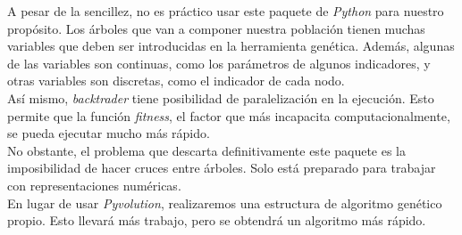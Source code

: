     A pesar de la sencillez, no es pr\'actico usar este paquete de \textit{Python} para nuestro prop\'osito. Los \'arboles que van a componer nuestra poblaci\'on tienen muchas variables que deben ser introducidas en la herramienta gen\'etica. Adem\'as, algunas de las variables son continuas, como los par\'ametros de algunos indicadores, y otras variables son discretas, como el indicador de cada nodo.\\
    
    As\'i mismo, \textit{backtrader} tiene posibilidad de paralelizaci\'on en la ejecuci\'on. Esto permite que la funci\'on \textit{fitness}, el factor que m\'as incapacita computacionalmente, se pueda ejecutar mucho m\'as r\'apido.\\
    
    No obstante, el problema que descarta definitivamente este paquete es la imposibilidad de hacer cruces entre \'arboles. Solo est\'a preparado para trabajar con representaciones num\'ericas.\\
    
    En lugar de usar \textit{Pyvolution}, realizaremos una estructura de algoritmo gen\'etico propio. Esto llevar\'a m\'as trabajo, pero se obtendr\'a un algoritmo m\'as r\'apido.\\